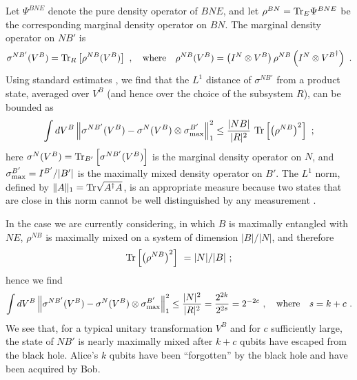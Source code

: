 \documentclass[11pt]{article}
\begin{document}
Let $\Psi^{BNE}$ denote the pure density operator of $BNE$,  and let $\rho^{BN}={\rm Tr}_E\Psi^{BNE}$ be the corresponding marginal density operator on $BN$. The marginal density operator on $NB'$ is
\begin{eqnarray}
\sigma^{NB'}(V^B)= {\rm Tr}_R \left[\rho^{NB}(V^B)\right]~, \quad {\rm where}\quad 
\rho^{NB}(V^B)=\left(I^N\otimes V^B\right)\rho^{NB}\left(I^N\otimes {V^B}^\dagger \right)~.
\end{eqnarray}
Using standard estimates \cite{abeyesinghe,yard}, we find that the $L^1$ distance of $\sigma^{NB'}$ from a product state, averaged over $V^B$ (and hence over the choice of the subsystem $R$), can be bounded as
\begin{eqnarray}
\int dV^B\left\| \sigma^{NB'}(V^B)-\sigma^{N}(V^B)\otimes \sigma^{B'}_{\rm max}\right\|_1^2 \le \frac{|NB|}{|R|^2}~{\rm Tr}\left[\left(\rho^{NB}\right)^2\right]~;
\end{eqnarray}
here $\sigma^{N}(V^B)={\rm Tr}_{B'}\left[\sigma^{NB'}(V^B)\right]$
is the marginal density operator on $N$, and $\sigma^{B'}_{\rm max}= I^{B'}/|B'|$ is the maximally mixed density operator on $B'$. The $L^1$ norm, defined by $\|A\|_1= {\rm Tr} \sqrt{A^\dagger A}$, is an appropriate measure because two states that are close in this norm cannot be well distinguished by any measurement \cite{fuchs}. 

In the case we are currently considering, in which $B$ is maximally entangled with $NE$, $\rho^{NB}$ is maximally mixed on a system of dimension $|B|/|N|$, and therefore 
\begin{equation}
{\rm Tr}\left[\left(\rho^{NB}\right)^2\right]~= |N|/|B|~;
\end{equation}
hence we find
\begin{eqnarray}
\label{quantum-out}
\int dV^B\left\| \sigma^{NB'}(V^B)-\sigma^{N}(V^B)\otimes \sigma^{B'}_{\rm max}\right\|_1^2 \le \frac{|N|^2}{|R|^2}= \frac{2^{2k}}{2^{2s}}= 2^{-2c}~,\quad {\rm where}\quad s=k+c~.
\end{eqnarray}
We see that, for a typical unitary transformation $V^B$ and for $c$ sufficiently large, the state of $NB'$ is nearly maximally mixed after $k+c$ qubits have escaped from the black hole. Alice's $k$ qubits have been ``forgotten'' by the black hole and have been acquired by Bob.  
\end{document}
